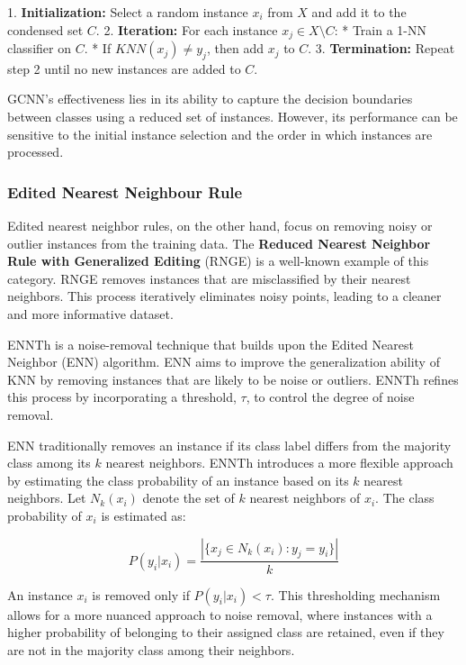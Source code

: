 1. \textbf{Initialization:} Select a random instance $x_i$ from $X$ and add it to the condensed set $C$.
2. \textbf{Iteration:} For each instance $x_j \in X \setminus C$:
    * Train a 1-NN classifier on $C$.
    * If $KNN(x_j) \neq y_j$, then add $x_j$ to $C$.
3. \textbf{Termination:} Repeat step 2 until no new instances are added to $C$.

GCNN's effectiveness lies in its ability to capture the decision boundaries between classes using a reduced 
set of instances. However, its performance can be sensitive to the initial instance selection and the order 
in which instances are processed.



\subsubsection{Edited Nearest Neighbour Rule}
Edited nearest neighbor rules, on the other hand, focus on removing noisy or outlier 
instances from the training data. The \textbf{Reduced Nearest Neighbor Rule with Generalized
Editing} (RNGE) is a well-known example of this category. RNGE removes instances 
that are misclassified by their nearest neighbors. This process iteratively eliminates
 noisy points, leading to a cleaner and more informative dataset.


ENNTh \cite{wilson1972asymptotic} is a noise-removal technique that builds upon the Edited Nearest Neighbor (ENN) algorithm. ENN aims to improve the generalization ability of KNN by removing instances that are likely to be noise or outliers. ENNTh refines this process by incorporating a threshold, $\tau$, to control the degree of noise removal.

ENN traditionally removes an instance if its class label differs from the majority class among its $k$ nearest neighbors. ENNTh introduces a more flexible approach by estimating the class probability of an instance based on its $k$ nearest neighbors. Let $N_k(x_i)$ denote the set of $k$ nearest neighbors of $x_i$. The class probability of $x_i$ is estimated as:

\begin{equation}
P(y_i | x_i) = \frac{|\{x_j \in N_k(x_i) : y_j = y_i\}|}{k}
\end{equation}

An instance $x_i$ is removed only if $P(y_i | x_i) < \tau$. This thresholding mechanism allows for a more nuanced approach to noise removal, where instances with a higher probability of belonging to their assigned class are retained, even if they are not in the majority class among their neighbors.

